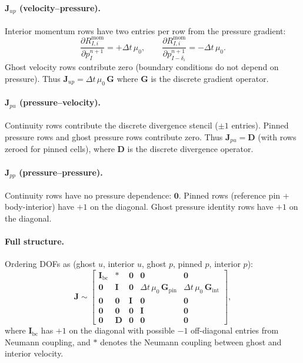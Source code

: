 \documentclass[11pt]{article}
\newcommand{\vect}[1]{\bm{#1}}
\newcommand{\pp}{\partial}
\begin{document}
\paragraph{$\vect{J}_{up}$ (velocity--pressure).}
Interior momentum rows have two entries per row from the pressure gradient:
\[
  \frac{\pp R^{\mathrm{mom}}_{I,i}}{\pp p^{n+1}_I} = +\Delta t\,\mu_0,
  \qquad
  \frac{\pp R^{\mathrm{mom}}_{I,i}}{\pp p^{n+1}_{I-\delta_i}} = -\Delta t\,\mu_0.
\]
Ghost velocity rows contribute zero (boundary conditions do not depend on
pressure).  Thus $\vect{J}_{up} = \Delta t\,\mu_0\,\vect{G}$ where
$\vect{G}$ is the discrete gradient operator.

\paragraph{$\vect{J}_{pu}$ (pressure--velocity).}
Continuity rows contribute the discrete divergence stencil ($\pm 1$
entries).  Pinned pressure rows and ghost pressure rows contribute zero.
Thus $\vect{J}_{pu} = \vect{D}$ (with rows zeroed for pinned cells),
where $\vect{D}$ is the discrete divergence operator.

\paragraph{$\vect{J}_{pp}$ (pressure--pressure).}
Continuity rows have no pressure dependence: $\vect{0}$.
Pinned rows (reference pin + body-interior) have $+1$ on the diagonal.
Ghost pressure identity rows have $+1$ on the diagonal.

\paragraph{Full structure.}
Ordering DOFs as
(ghost $u$, interior $u$, ghost $p$, pinned $p$, interior $p$):
\begin{equation}
  \vect{J} \sim
  \begin{bmatrix}
    \vect{I}_{\mathrm{bc}} & * & \vect{0} & \vect{0} & \vect{0} \\
    \vect{0} & \vect{I} & \vect{0} & \Delta t\,\mu_0\,\vect{G}_{\mathrm{pin}} & \Delta t\,\mu_0\,\vect{G}_{\mathrm{int}} \\
    \vect{0} & \vect{0} & \vect{I} & \vect{0} & \vect{0} \\
    \vect{0} & \vect{0} & \vect{0} & \vect{I} & \vect{0} \\
    \vect{0} & \vect{D} & \vect{0} & \vect{0} & \vect{0}
  \end{bmatrix},
\end{equation}
where $\vect{I}_{\mathrm{bc}}$ has $+1$ on the diagonal with possible
$-1$ off-diagonal entries from Neumann coupling, and $*$ denotes the
Neumann coupling between ghost and interior velocity.
\end{document}
